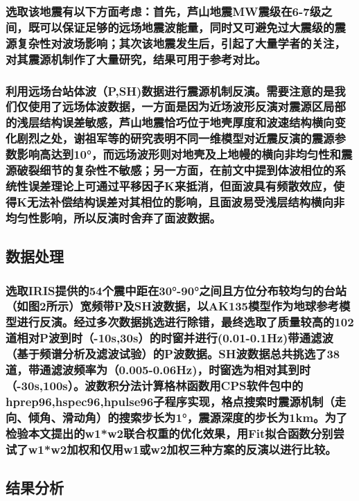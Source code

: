 \documentclass[a4paper,12pt,single,pdftex]{scrartcl}
\begin{document}
\label{ID_197380368}\subsubsection{选取该地震有以下方面考虑：首先，芦山地震MW震级在6-7级之间，既可以保证足够的远场地震波能量，同时又可避免过大震级的震源复杂性对波场影响；其次该地震发生后，引起了大量学者的关注，对其震源机制作了大量研究，结果可用于参考对比。}

\label{ID_465668819}\subsubsection{利用远场台站体波（P,SH)数据进行震源机制反演。需要注意的是我们仅使用了远场体波数据，一方面是因为近场波形反演对震源区局部的浅层结构误差敏感，芦山地震恰巧位于地壳厚度和波速结构横向变化剧烈之处，谢祖军等的研究表明不同一维模型对近震反演的震源参数影响高达到10°，而远场波形则对地壳及上地幔的横向非均匀性和震源破裂细节的复杂性不敏感；另一方面，在前文中提到体波相位的系统性误差理论上可通过平移因子K来抵消，但面波具有频散效应，使得K无法补偿结构误差对其相位的影响，且面波易受浅层结构横向非均匀性影响，所以反演时舍弃了面波数据。}

\label{ID_1181782570}\subsection{数据处理}

\label{ID_1085717567}\subsubsection{选取IRIS提供的54个震中距在30°-90°之间且方位分布较均匀的台站（如图2所示）宽频带P及SH波数据，以AK135模型\cite{Kennett1995}作为地球参考模型进行反演。经过多次数据挑选进行除错，最终选取了质量较高的102道相对P波到时（-10s,30s）的时窗并进行(0.01-0.1Hz)带通滤波（基于频谱分析及滤波试验）的P波数据。SH波数据总共挑选了38道，带通滤波频率为（0.005-0.06Hz)，时窗选为相对其到时（-30s,100s）。波数积分法计算格林函数用CPS软件包中的hprep96,hspec96,hpulse96子程序实现，格点搜索时震源机制（走向、倾角、滑动角）的搜索步长为1°，震源深度的步长为1km。为了检验本文提出的w1*w2联合权重的优化效果，用Fit拟合函数分别尝试了w1*w2加权和仅用w1或w2加权三种方案的反演以进行比较。}

\label{ID_491927039}\subsection{结果分析}
\end{document}
